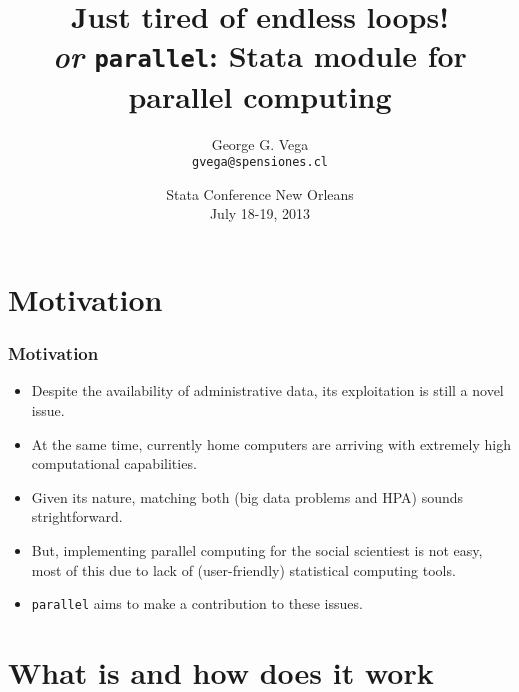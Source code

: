 \documentclass[9pt,handout]{beamer}
\title[{\tt parallel}]{Just tired of endless loops! \\ {\it \footnotesize or} {\normalsize {\tt parallel}: Stata module for parallel computing}}
\author[GGV]{George G. Vega\\ {\tt \scriptsize gvega@spensiones.cl}}
\institute[SPensiones]{Chilean Pension Supervisor}
\date{Stata Conference New Orleans\\July 18-19, 2013}
\begin{document}


\section{Motivation}

\begin{frame} %
\frametitle{Motivation}
\begin{itemize}
\item Despite the availability of administrative data, its exploitation is still a novel issue.\pause
\item At the same time, currently home computers are arriving with extremely high computational capabilities.\pause
\item Given its nature, matching both (big data problems and HPA) sounds strightforward.\pause
\item But, implementing parallel computing for the social scientiest is not easy,
\pause most of this due to lack of (user-friendly) statistical computing tools.\pause
\item {\tt parallel} aims to make a contribution to these issues.
\end{itemize}
\end{frame}

\section{What is and how does it work}

\frame{\tableofcontents[currentsection]}
\end{document}
